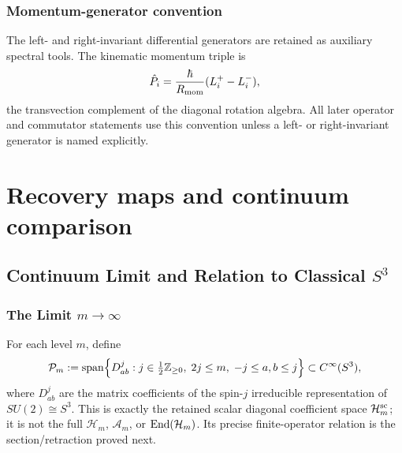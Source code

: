 \documentclass[12pt,a4paper]{article}
\begin{document}
\subsubsection{Momentum-generator convention}

The left- and right-invariant differential generators are retained as auxiliary
spectral tools.  The kinematic momentum triple is
\[
\hat P_i=\frac{\hbar}{R_{\mathrm{mom}}}(L_i^+-L_i^-),
\]
the transvection complement of the diagonal rotation algebra.  All later
operator and commutator statements use this convention unless a left- or
right-invariant generator is named explicitly.


\section{Recovery maps and continuum comparison}
\label{paper2b:sec:organized-recovery}

\subsection{\texorpdfstring{Continuum Limit and Relation to Classical $S^3$}{Continuum Limit and Relation to Classical S³}}

\subsubsection{\texorpdfstring{The Limit $m \to \infty$}{The Limit m}}

\begin{definition}
\label{p2:def:retained-pw-symbols}
For each level $m$, define
\[
\mathcal P_m
:=
\operatorname{span}\Bigl\{D^j_{ab}: j\in \tfrac12\mathbb{Z}_{\ge0},\; 2j\le m,\; -j\le a,b\le j\Bigr\}
\subset C^\infty(S^3),
\]
where $D^j_{ab}$ are the matrix coefficients of the spin-$j$ irreducible
representation of $SU(2)\cong S^3$.  This is exactly the retained scalar
diagonal coefficient space
\(\mathcal H_m^{\rm sc}\); it is not the full \(\mathcal H_m\),
\(\mathcal A_m\), or \(\operatorname{End}(\mathcal H_m)\).  Its precise finite-operator
relation is the section/retraction proved next.
\end{definition}
\end{document}
